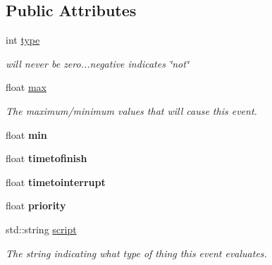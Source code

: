 \subsection*{Public Attributes}
\begin{DoxyCompactItemize}
\item 
int \hyperlink{structAIEvents_1_1AIEvresult_a9451d24c24b691e1e5da2858d89d03ad}{type}\hypertarget{structAIEvents_1_1AIEvresult_a9451d24c24b691e1e5da2858d89d03ad}{}\label{structAIEvents_1_1AIEvresult_a9451d24c24b691e1e5da2858d89d03ad}

\begin{DoxyCompactList}\small\item\em will never be zero...negative indicates \char`\"{}not\char`\"{} \end{DoxyCompactList}\item 
float \hyperlink{structAIEvents_1_1AIEvresult_a73c1e1005a163ac566b75b9afd027bc3}{max}\hypertarget{structAIEvents_1_1AIEvresult_a73c1e1005a163ac566b75b9afd027bc3}{}\label{structAIEvents_1_1AIEvresult_a73c1e1005a163ac566b75b9afd027bc3}

\begin{DoxyCompactList}\small\item\em The maximum/minimum values that will cause this event. \end{DoxyCompactList}\item 
float {\bfseries min}\hypertarget{structAIEvents_1_1AIEvresult_a68b71858307ee62a074feeca707fda3a}{}\label{structAIEvents_1_1AIEvresult_a68b71858307ee62a074feeca707fda3a}

\item 
float {\bfseries timetofinish}\hypertarget{structAIEvents_1_1AIEvresult_a0940eca480092c355ecaa149d90f531a}{}\label{structAIEvents_1_1AIEvresult_a0940eca480092c355ecaa149d90f531a}

\item 
float {\bfseries timetointerrupt}\hypertarget{structAIEvents_1_1AIEvresult_a7631fea1f7b2f53c66f0403bf9b6ee27}{}\label{structAIEvents_1_1AIEvresult_a7631fea1f7b2f53c66f0403bf9b6ee27}

\item 
float {\bfseries priority}\hypertarget{structAIEvents_1_1AIEvresult_a93c4ca9b48c328966ae0e753f967444c}{}\label{structAIEvents_1_1AIEvresult_a93c4ca9b48c328966ae0e753f967444c}

\item 
std\+::string \hyperlink{structAIEvents_1_1AIEvresult_a99b7c2d135ba0fa700b75da038972259}{script}\hypertarget{structAIEvents_1_1AIEvresult_a99b7c2d135ba0fa700b75da038972259}{}\label{structAIEvents_1_1AIEvresult_a99b7c2d135ba0fa700b75da038972259}

\begin{DoxyCompactList}\small\item\em The string indicating what type of thing this event evaluates. \end{DoxyCompactList}\end{DoxyCompactItemize}



